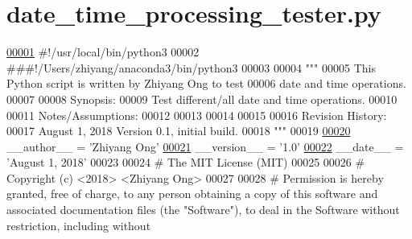 \hypertarget{date__time__processing__tester_8py_source}{}\section{date\+\_\+time\+\_\+processing\+\_\+tester.\+py}
\label{date__time__processing__tester_8py_source}

\begin{DoxyCode}
\hypertarget{date__time__processing__tester_8py_source_l00001}{}\hyperlink{namespaceutilities_1_1date__time__processing__tester}{00001} \textcolor{comment}{#!/usr/local/bin/python3}
00002 \textcolor{comment}{###!/Users/zhiyang/anaconda3/bin/python3}
00003 
00004 \textcolor{stringliteral}{"""}
00005 \textcolor{stringliteral}{    This Python script is written by Zhiyang Ong to test}
00006 \textcolor{stringliteral}{        date and time operations.}
00007 \textcolor{stringliteral}{}
00008 \textcolor{stringliteral}{    Synopsis:}
00009 \textcolor{stringliteral}{    Test different/all date and time operations.}
00010 \textcolor{stringliteral}{}
00011 \textcolor{stringliteral}{    Notes/Assumptions:}
00012 \textcolor{stringliteral}{}
00013 \textcolor{stringliteral}{}
00014 \textcolor{stringliteral}{}
00015 \textcolor{stringliteral}{}
00016 \textcolor{stringliteral}{    Revision History:}
00017 \textcolor{stringliteral}{    August 1, 2018          Version 0.1, initial build.}
00018 \textcolor{stringliteral}{"""}
00019 
\hypertarget{date__time__processing__tester_8py_source_l00020}{}\hyperlink{namespaceutilities_1_1date__time__processing__tester_ae1106460c338050149a3f7aa6690002a}{00020} \_\_author\_\_ = \textcolor{stringliteral}{'Zhiyang Ong'}
\hypertarget{date__time__processing__tester_8py_source_l00021}{}\hyperlink{namespaceutilities_1_1date__time__processing__tester_a98cf80a86a0ee83e7b23e071b489b6b8}{00021} \_\_version\_\_ = \textcolor{stringliteral}{'1.0'}
\hypertarget{date__time__processing__tester_8py_source_l00022}{}\hyperlink{namespaceutilities_1_1date__time__processing__tester_a3cf1bc57db206c3849901a593e205b09}{00022} \_\_date\_\_ = \textcolor{stringliteral}{'August 1, 2018'}
00023 
00024 \textcolor{comment}{#   The MIT License (MIT)}
00025 
00026 \textcolor{comment}{#   Copyright (c) <2018> <Zhiyang Ong>}
00027 
00028 \textcolor{comment}{#   Permission is hereby granted, free of charge, to any person obtaining a copy of this software and
       associated documentation files (the "Software"), to deal in the Software without restriction, including without
}
\end{DoxyCode}
